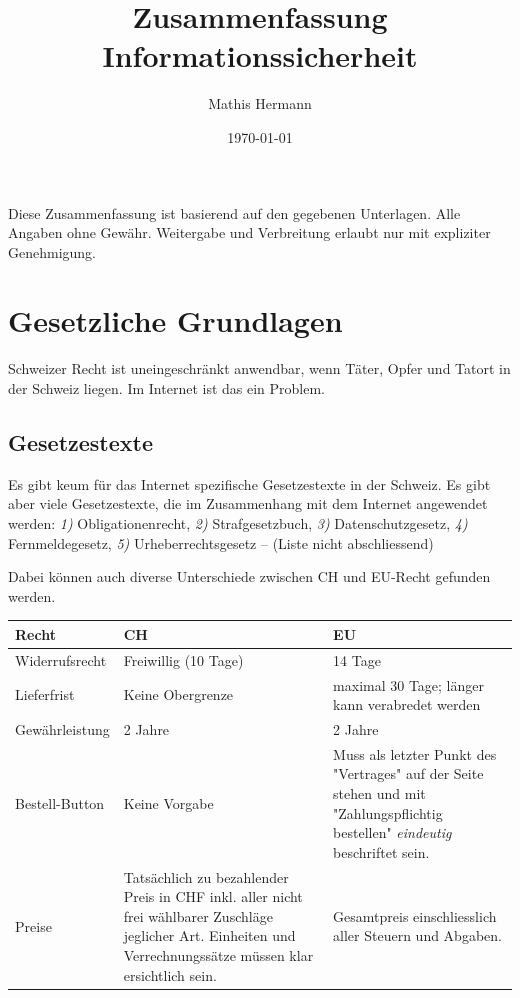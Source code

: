 \documentclass[a4paper,12pt]{article}
\begin{document}
\title{Zusammenfassung Informationssicherheit}
\author{Mathis Hermann}
\date{\today}
\maketitle

Diese Zusammenfassung ist basierend auf den gegebenen Unterlagen. Alle Angaben ohne Gewähr. Weitergabe und Verbreitung erlaubt nur mit expliziter Genehmigung.

\section{Gesetzliche Grundlagen}
Schweizer Recht ist uneingeschränkt anwendbar, wenn Täter, Opfer und Tatort in der Schweiz liegen. Im Internet ist das ein Problem.

\subsection{Gesetzestexte}
Es gibt keum für das Internet spezifische Gesetzestexte in der Schweiz. Es gibt aber viele Gesetzestexte, die im Zusammenhang mit dem Internet angewendet werden: \emph{1)} Obligationenrecht, \emph{2)} Strafgesetzbuch,  \emph{3)} Datenschutzgesetz,  \emph{4)} Fernmeldegesetz,  \emph{5)} Urheberrechtsgesetz -- (Liste nicht abschliessend)

Dabei können auch diverse Unterschiede zwischen CH und EU-Recht gefunden werden.
\begin{center}
\begin{tabular}{ | m{2.5cm} | m{4.5cm} | m{4.5cm} | } 
Recht & CH & EU\\ 
\hline
Widerrufsrecht & Freiwillig (10 Tage) & 14 Tage\\
Lieferfrist & Keine Obergrenze & maximal 30 Tage; länger kann verabredet werden\\
Gewährleistung & 2 Jahre & 2 Jahre\\
Bestell-Button & Keine Vorgabe & Muss als letzter Punkt des "Vertrages" auf der Seite stehen und mit "Zahlungspflichtig bestellen" \emph{eindeutig} beschriftet sein.\\
Preise & Tatsächlich zu bezahlender Preis in CHF inkl. aller nicht frei wählbarer Zuschläge jeglicher Art. Einheiten und Verrechnungssätze müssen klar ersichtlich sein. & Gesamtpreis einschliesslich aller Steuern und Abgaben.\\
\end{tabular}
\end{center}
\end{document}
